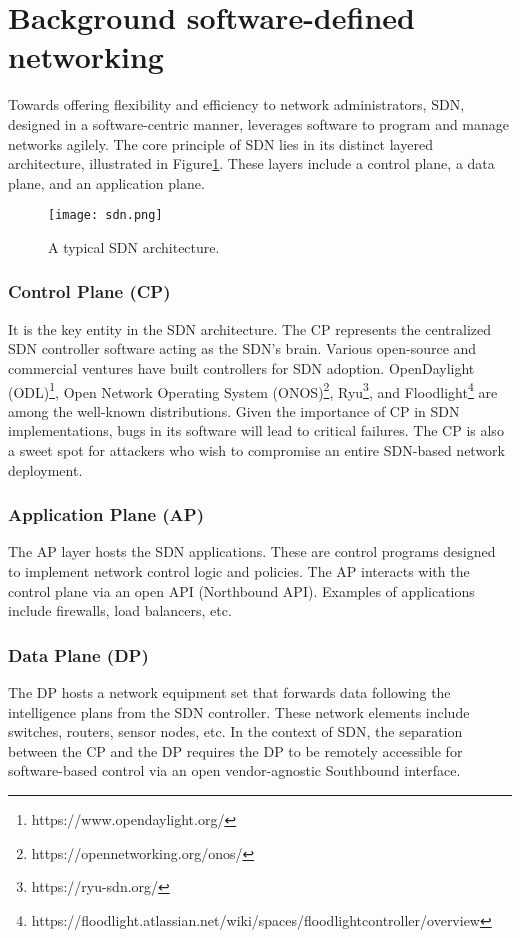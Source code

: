 \section{Background software-defined networking}\label{sec:bckg}
Towards offering flexibility and efficiency to network administrators, SDN, designed in a software-centric manner, leverages software to program and manage networks agilely. The core principle of SDN lies in its distinct layered architecture, illustrated in Figure\ref{fig_sdn}. These layers include a control plane, a data plane, and an application plane. 

\begin{figure}[ht!]
  \centering
  \texttt{[image: sdn.png]}
  \caption{A typical SDN architecture.}
    \label{fig_sdn}
\end{figure}

\subsubsection{Control Plane (CP)}\label{sec:c}
It is the key entity in the SDN architecture. The CP represents the centralized SDN controller software acting as the SDN's brain\citep{ol1}. Various open-source and commercial ventures have built controllers for SDN adoption. OpenDaylight (ODL)\footnote{https://www.opendaylight.org/}, Open Network Operating System (ONOS)\footnote{https://opennetworking.org/onos/}, Ryu\footnote{https://ryu-sdn.org/}, and Floodlight\footnote{https://floodlight.atlassian.net/wiki/spaces/floodlightcontroller/overview} are among the well-known distributions.  
Given the importance of CP in SDN implementations, bugs in its software will lead to critical failures. The CP is also a sweet spot for attackers who wish to compromise an entire SDN-based network deployment.

\subsubsection{Application Plane (AP)}\label{sec:a}
The AP layer hosts the SDN applications. These are control programs designed to implement network control logic and policies. The AP interacts with the control plane via an open API (Northbound API). Examples of applications include firewalls, load balancers, etc.

\subsubsection{Data Plane (DP)}
The DP hosts a network equipment set that forwards data following the intelligence plans from the SDN controller. These network elements include switches, routers, sensor nodes, etc. In the context of SDN, the separation between the CP and the DP requires the DP to be remotely accessible for software-based control via an open vendor-agnostic Southbound interface.

